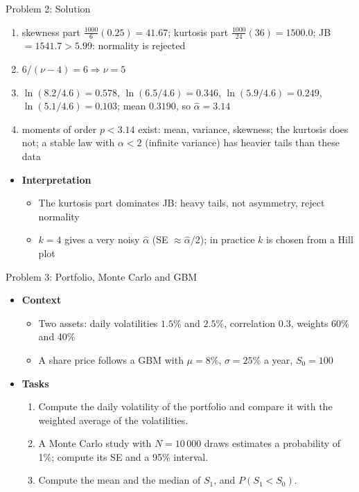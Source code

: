 \begin{frame}{Problem 2: Solution}
\itemsize{\footnotesize}
\begin{enumerate}
    \item skewness part $\frac{1000}{6}(0.25) = 41.67$; kurtosis part $\frac{1000}{24}(36) = 1500.0$; JB $= 1541.7 > 5.99$: normality is rejected
    \item $6/(\nu - 4) = 6 \Rightarrow \nu = 5$
    \item $\ln(8.2/4.6) = 0.578$, $\ln(6.5/4.6) = 0.346$, $\ln(5.9/4.6) = 0.249$, $\ln(5.1/4.6) = 0.103$; mean $0.3190$, so $\hat\alpha = 3.14$
    \item moments of order $p < 3.14$ exist: mean, variance, skewness; the kurtosis does not; a stable law with $\alpha < 2$ (infinite variance) has heavier tails than these data
\end{enumerate}
\begin{itemize}
    \item \textbf{Interpretation}
    \begin{itemize}
        \item The kurtosis part dominates JB: heavy tails, not asymmetry, reject normality
        \item $k = 4$ gives a very noisy $\hat\alpha$ (SE $\approx \hat\alpha/2$); in practice $k$ is chosen from a Hill plot
    \end{itemize}
\end{itemize}
\end{frame}

\begin{frame}{Problem 3: Portfolio, Monte Carlo and GBM}
\itemsize{\footnotesize}
\begin{itemize}
    \item \textbf{Context}
    \begin{itemize}
        \item Two assets: daily volatilities $1.5\%$ and $2.5\%$, correlation $0.3$, weights 60\% and 40\%
        \item A share price follows a GBM with $\mu = 8\%$, $\sigma = 25\%$ a year, $S_0 = 100$
    \end{itemize}
    \item \textbf{Tasks}
\begin{enumerate}
    \item Compute the daily volatility of the portfolio and compare it with the weighted average of the volatilities.
    \item A Monte Carlo study with $N = 10\,000$ draws estimates a probability of 1\%; compute its SE and a 95\% interval.
    \item Compute the mean and the median of $S_1$, and $P(S_1 < S_0)$.
\end{enumerate}
\end{itemize}
\end{frame}

